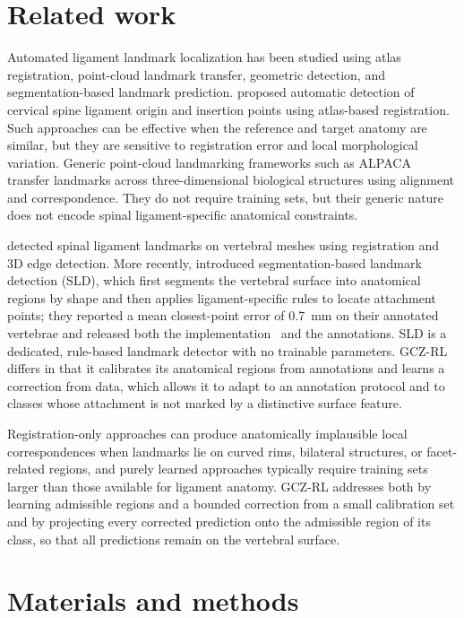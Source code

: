 \documentclass[5p,times,twocolumn,authoryear]{elsarticle}
\newif\ifhighlight
\newcommand{\rev}[1]{\ifhighlight{\color{revcolor}#1}\else#1\fi}
\begin{document}
\section{Related work}
\label{sec:related}

Automated ligament landmark localization has been studied using atlas registration, point-cloud landmark transfer, geometric detection, and segmentation-based landmark prediction. \citet{aldhamari2019} proposed automatic detection of cervical spine ligament origin and insertion points using atlas-based registration. Such approaches can be effective when the reference and target anatomy are similar, but they are sensitive to registration error and local morphological variation. Generic point-cloud landmarking frameworks such as ALPACA~\citep{porto2021} transfer landmarks across three-dimensional biological structures using alignment and correspondence. They do not require training sets, but their generic nature does not encode spinal ligament-specific anatomical constraints.

\citet{kramer2024} detected spinal ligament landmarks on vertebral meshes using registration and 3D edge detection. More recently, \citet{blomenkamp2026sld} introduced segmentation-based landmark detection (SLD), which first segments the vertebral surface into anatomical regions by shape and then applies ligament-specific rules to locate attachment points; they reported a mean closest-point error of 0.7~mm on their annotated vertebrae and released both the implementation~\citep{spinetoolkit2026} and the annotations. SLD is a dedicated, rule-based landmark detector with no trainable parameters. GCZ-RL differs in that it calibrates its anatomical regions from annotations and learns a correction from data, which allows it to adapt to an annotation protocol and to classes whose attachment is not marked by a distinctive surface feature.

Registration-only approaches can produce anatomically implausible local correspondences when landmarks lie on curved rims, bilateral structures, or facet-related regions, and purely learned approaches typically require training sets larger than those available for ligament anatomy. GCZ-RL addresses both by learning admissible regions and a bounded correction from a small calibration set \rev{and by projecting every corrected prediction onto the admissible region of its class, so that all predictions remain on the vertebral surface}.

\section{Materials and methods}
\label{sec:methods}
\end{document}

